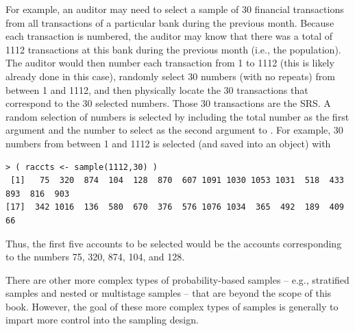 \documentclass[10pt,openany]{book}\usepackage[]{graphicx}\usepackage[]{color}
\makeatletter
\newenvironment{kframe}{%
 \def\at@end@of@kframe{}%
 \ifinner\ifhmode%
  \def\at@end@of@kframe{\end{minipage}}%
  \begin{minipage}{\columnwidth}%
 \fi\fi%
 \def\FrameCommand##1{\hskip\@totalleftmargin \hskip-\fboxsep
 \colorbox{shadecolor}{##1}\hskip-\fboxsep
     \hskip-\linewidth \hskip-\@totalleftmargin \hskip\columnwidth}%
 \MakeFramed {\advance\hsize-\width
   \@totalleftmargin\z@ \linewidth\hsize
   \@setminipage}}%
 {\par\unskip\endMakeFramed%
 \at@end@of@kframe}
\newenvironment{knitrout}{}{} %
\makeatother
\begin{document}
For example, an auditor may need to select a sample of 30 financial transactions from all transactions of a particular bank during the previous month.  Because each transaction is numbered, the auditor may know that there was a total of 1112 transactions at this bank during the previous month (i.e., the population).  The auditor would then number each transaction from 1 to 1112 (this is likely already done in this case), randomly select 30 numbers (with no repeats) from between 1 and 1112, and then physically locate the 30 transactions that correspond to the 30 selected numbers.  Those 30 transactions are the SRS.  A random selection of numbers is selected by including the total number as the first argument and the number to select as the second argument to .  For example, 30 numbers from between 1 and 1112 is selected (and saved into an object) with
\begin{knitrout}
\color{fgcolor}\begin{kframe}
\begin{verbatim}
> ( raccts <- sample(1112,30) )
 [1]   75  320  874  104  128  870  607 1091 1030 1053 1031  518  433  893  816  903
[17]  342 1016  136  580  670  376  576 1076 1034  365  492  189  409   66
\end{verbatim}
\end{kframe}
\end{knitrout}
Thus, the first five accounts to be selected would be the accounts corresponding to the numbers 75, 320, 874, 104, and 128.

There are other more complex types of probability-based samples -- e.g., stratified samples and nested or multistage samples -- that are beyond the scope of this book.  However, the goal of these more complex types of samples is generally to impart more control into the sampling design.


\vspace{-12pt}

\vspace{-12pt}
\end{document}
